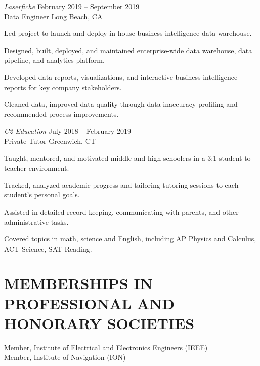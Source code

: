 \documentclass[]{res}
\newenvironment{list1}{
  \begin{list}{\ding{113}}{%
      \setlength{\itemsep}{0in}
      \setlength{\parsep}{0in} \setlength{\parskip}{0in}
      \setlength{\topsep}{0in} \setlength{\partopsep}{0in} 
      \setlength{\leftmargin}{0.17in}}}{\end{list}}
\begin{document}
\begin{resume}
\emph{Laserfiche} \hfill {February 2019 -- September 2019} \\
Data Engineer \hfill Long Beach, CA \\
\begin{list1}
\item[] Led project to launch and deploy in-house business intelligence data warehouse.
\item[] Designed, built, deployed, and maintained enterprise-wide data warehouse, data pipeline, and analytics platform.
\item[] Developed data reports, visualizations, and interactive business intelligence reports for key company stakeholders.
\item[] Cleaned data, improved data quality through data inaccuracy profiling and recommended process improvements.
\end{list1}


\emph{C2 Education} \hfill {July 2018 -- February 2019}\\
Private Tutor \hfill Greenwich, CT \\
\begin{list1}
\item[] Taught, mentored, and motivated middle and high schoolers in a 3:1 student to teacher environment.
\item[] Tracked, analyzed academic progress and tailoring tutoring sessions to each student’s personal goals.
\item[] Assisted in detailed record-keeping, communicating with parents, and other administrative tasks.
\item[] Covered topics in math, science and English, including AP Physics and Calculus, ACT Science, SAT Reading.
\end{list1}

\section{MEMBERSHIPS IN PROFESSIONAL AND HONORARY SOCIETIES}
\vspace{1mm}
Member, Institute of Electrical and Electronics Engineers (IEEE) \\
Member, Institute of Navigation (ION)



\end{resume}
\end{document}

